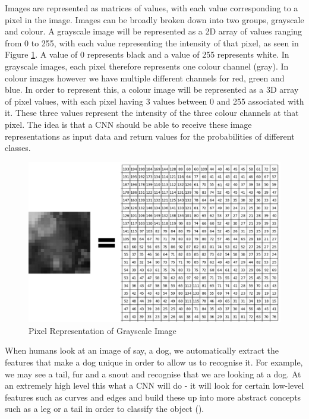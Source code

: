 \documentclass[12pt]{report}
\begin{document}
\begin{flushleft}
Images are represented as matrices of values, with each value corresponding to a pixel in the image. Images can be broadly broken down into two groups, grayscale and colour. A grayscale image will be represented as a 2D array of values ranging from 0 to 255, with each value representing the intensity of that pixel, as seen in Figure \ref{fig:pixels}. A value of 0 represents black and a value of 255 represents white. In grayscale images, each pixel therefore represents one colour channel (gray). In colour images however we have multiple different channels for red, green and blue. In order to represent this, a colour image will be represented as a 3D array of pixel values, with each pixel having 3 values between 0 and 255 associated with it. These three values represent the intensity of the three colour channels at that pixel. The idea is that a CNN should be able to receive these image representations as input data and return values for the probabilities of different classes.
\end{flushleft}

\vspace{0.5cm}
\begin{figure}[h]
	\centering
	\includegraphics[width=12cm]{pixels}
	\caption{Pixel Representation of Grayscale Image}
	\label{fig:pixels}
\end{figure}

\begin{flushleft}
When humans look at an image of say, a dog, we automatically extract the features that make a dog unique in order to allow us to recognise it. For example, we may see a tail, fur and a snout and recognise that we are looking at a dog. At an extremely high level this what a CNN will do - it will look for certain low-level features such as curves and edges and build these up into more abstract concepts such as a leg or a tail in order to classify the object (\cite{lecun1995convolutional}).
\end{flushleft}
\end{document}
